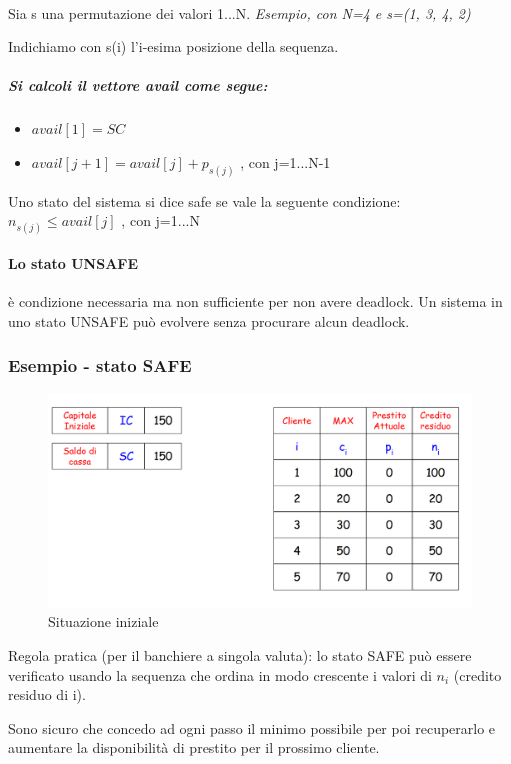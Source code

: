 \paragraph{}
Sia s una permutazione dei valori 1...N. \textit{Esempio, con N=4 e s=(1, 3, 4, 2)}

Indichiamo con s(i) l'i-esima posizione della sequenza.

\subparagraph{Si calcoli il vettore \textbf{avail} come segue:}
\begin{itemize}
    \item $avail[1] = SC$
    \item $avail[j+1] = avail[j] + p_{s(j)}$ , con j=1...N-1
\end{itemize}

Uno stato del sistema si dice safe se vale la seguente condizione:
$n_{s(j)} \le avail[j]$ , con j=1...N

\paragraph{Lo stato UNSAFE} è condizione necessaria ma non sufficiente per non avere deadlock. Un sistema in uno stato UNSAFE può evolvere senza procurare alcun deadlock.

\subsubsection{Esempio - stato SAFE} 

\begin{figure}[h]
    \centering
    \includegraphics[width=0.7\linewidth]{Images/Screenshot 2025-01-15 113351.png}
    \caption{Situazione iniziale}
\end{figure}

Regola pratica (per il banchiere a singola valuta):
lo stato SAFE può essere verificato usando la sequenza che ordina in modo crescente i valori di $n_i$ (credito residuo di i).

Sono sicuro che concedo ad ogni passo il minimo possibile per poi recuperarlo e aumentare la disponibilità di prestito per il prossimo cliente.
\newpage 

